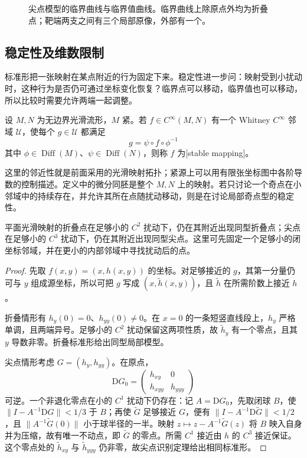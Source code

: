 \begin{figure}[htbp]
	\centering
	
	\caption{尖点模型的临界曲线与临界值曲线。临界曲线上除原点外均为折叠点；靶端两支之间有三个局部原像，外部有一个。}
	\label{g2:fig:plane-cusp-curves}
\end{figure}

\subsection{稳定性及维数限制}
\label{g2:subsec:D03:04}

标准形把一张映射在某点附近的行为固定下来。稳定性进一步问：映射受到小扰动时，这种行为是否仍可通过坐标变化恢复？临界点可以移动，临界值也可以移动，所以比较时需要允许两端一起调整。

\begin{definition}\label{g2:def:smooth-map-stability}
	设 \(M,N\) 为无边界光滑流形，\(M\) 紧。若 \(f\in C^\infty(M,N)\) 有一个 Whitney \(C^\infty\) 邻域 \(\mathcal U\)，使每个 \(g\in\mathcal U\) 都满足
	\[
		g=\psi\circ f\circ\phi^{-1}
	\]
	其中 \(\phi\in\operatorname{Diff}(M)\)、\(\psi\in\operatorname{Diff}(N)\)，则称 \(f\) 为[stable mapping]。
\end{definition}

这里的邻近性就是前面采用的光滑映射拓扑；紧源上可以用有限张坐标图中各阶导数的控制描述。定义中的微分同胚是整个 \(M,N\) 上的映射。若只讨论一个奇点在小邻域中的持续存在，并允许其所在点随扰动移动，则是在讨论局部奇点型的稳定性。

\begin{proposition}\label{g2:prop:plane-fold-cusp-persistence}
	平面光滑映射的折叠点在足够小的 \(C^2\) 扰动下，仍在其附近出现同型折叠点；尖点在足够小的 \(C^3\) 扰动下，仍在其附近出现同型尖点。这里可先固定一个足够小的闭坐标邻域，并在更小的内部邻域中寻找扰动后的点。
\end{proposition}
\begin{proof}
	先取 \(f(x,y)=(x,h(x,y))\) 的坐标。对足够接近的 \(g\)，其第一分量仍可与 \(y\) 组成源坐标，所以可把 \(g\) 写成 \((x,\widetilde h(x,y))\)，且 \(\widetilde h\) 在所需阶数上接近 \(h\)。

	折叠情形有 \(h_y(0)=0\)、\(h_{yy}(0)\ne0\)。在 \(x=0\) 的一条短竖直线段上，\(h_y\) 严格单调，且两端异号。足够小的 \(C^2\) 扰动保留这两项性质，故 \(\widetilde h_y\) 有一个零点，且其 \(y\) 导数非零。折叠标准形给出同型局部模型。

	尖点情形考虑 \(G=(h_y,h_{yy})\)。在原点，
	\[
		\mathrm DG_0=\begin{pmatrix}h_{xy}&0\\h_{xyy}&h_{yyy}\end{pmatrix}
	\]
	可逆。一个非退化零点在小的 \(C^1\) 扰动下仍存在：记 \(A=\mathrm DG_0\)，先取闭球 \(B\)，使 \(\|I-A^{-1}\mathrm DG\|<1/3\) 于 \(B\)；再使 \(\widetilde G\) 足够接近 \(G\)，便有 \(\|I-A^{-1}\mathrm D\widetilde G\|<1/2\)，且 \(\|A^{-1}\widetilde G(0)\|\) 小于球半径的一半。映射 \(z\mapsto z-A^{-1}\widetilde G(z)\) 将 \(B\) 映入自身并为压缩，故有唯一不动点，即 \(\widetilde G\) 的零点。所需 \(C^1\) 接近由 \(h\) 的 \(C^3\) 接近保证。这个零点处的 \(\widetilde h_{xy}\) 与 \(\widetilde h_{yyy}\) 仍非零，故尖点识别定理给出相同标准形。
\end{proof}

